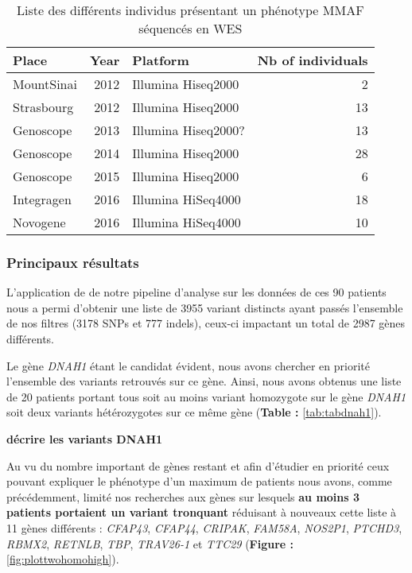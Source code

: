 \documentclass[12pt,twoside]{reedthesis}
\theoremstyle{definition}
\theoremstyle{definition}
\theoremstyle{remark}
\begin{document}
  \begin{longtable}[t]{lrlr}
  \caption{\label{tab:tabrunbigmmaf}Liste des différents individus présentant un phénotype MMAF séquencés en WES}\\
  \toprule
  Place & Year & Platform & Nb of individuals\\
  \midrule
  MountSinai & 2012 & Illumina Hiseq2000 & 2\\
  Strasbourg & 2012 & Illumina Hiseq2000 & 13\\
  Genoscope & 2013 & Illumina Hiseq2000? & 13\\
  Genoscope & 2014 & Illumina Hiseq2000 & 28\\
  Genoscope & 2015 & Illumina Hiseq2000 & 6\\
  \addlinespace
  Integragen & 2016 & Illumina HiSeq4000 & 18\\
  Novogene & 2016 & Illumina HiSeq4000 & 10\\
  \bottomrule
  \end{longtable}
  
  
  
  \newpage
  
  \subsubsection{Principaux résultats}\label{principaux-resultats-4}
  
  L'application de de notre pipeline d'analyse sur les données de ces 90
  patients nous a permi d'obtenir une liste de 3955 variant distincts
  ayant passés l'ensemble de nos filtres (3178 SNPs et 777 indels),
  ceux-ci impactant un total de 2987 gènes différents.
  
  Le gène \emph{DNAH1} étant le candidat évident, nous avons chercher en
  priorité l'ensemble des variants retrouvés sur ce gène. Ainsi, nous
  avons obtenus une liste de 20 patients portant tous soit au moins
  variant homozygote sur le gène \emph{DNAH1} soit deux variants
  hétérozygotes sur ce même gène (\textbf{Table : }\ref{tab:tabdnah1}).
  
  \textbf{décrire les variants DNAH1}
  
  Au vu du nombre important de gènes restant et afin d'étudier en priorité
  ceux pouvant expliquer le phénotype d'un maximum de patients nous avons,
  comme précédemment, limité nos recherches aux gènes sur lesquels
  \textbf{au moins 3 patients portaient un variant tronquant} réduisant à
  nouveaux cette liste à 11 gènes différents : \emph{CFAP43},
  \emph{CFAP44}, \emph{CRIPAK}, \emph{FAM58A}, \emph{NOS2P1},
  \emph{PTCHD3}, \emph{RBMX2}, \emph{RETNLB}, \emph{TBP}, \emph{TRAV26-1}
  et \emph{TTC29} (\textbf{Figure : }\ref{fig:plottwohomohigh}).
  
\end{document}
